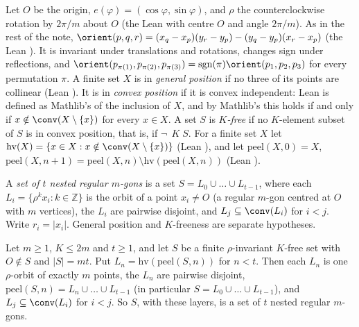 Let $O$ be the origin, $e(\varphi)=(\cos\varphi,\sin\varphi)$, and $\rho$ the counterclockwise rotation by $2\pi/m$
about $O$ (the Lean  with centre $O$ and angle $2\pi/m$). As in the rest of the note,
$\orient(p,q,r)=(x_q-x_p)(y_r-y_p)-(y_q-y_p)(x_r-x_p)$ (the Lean ). It is invariant under translations
and rotations, changes sign under reflections, and $\orient(p_{\pi(1)},p_{\pi(2)},p_{\pi(3)})=\sgn(\pi)\orient(p_1,p_2,p_3)$
for every permutation $\pi$. A finite set $X$ is in \emph{general position} if no three of its points are collinear
(Lean ). It is in \emph{convex position} if it is convex independent: Lean 
is defined as Mathlib's  of the inclusion of $X$, and by Mathlib's
 this holds if and only if $x\notin\conv(X\setminus\{x\})$ for
every $x\in X$. A set $S$ is \emph{$K$-free} if no $K$-element subset of $S$ is in convex position, that is, if
$\neg\,$$\;K\;S$. For a finite set $X$ let $\mathrm{hv}(X)=\{x\in X: x\notin\conv(X\setminus\{x\})\}$
(Lean ), and let $\mathrm{peel}(X,0)=X$,
$\mathrm{peel}(X,n+1)=\mathrm{peel}(X,n)\setminus\mathrm{hv}(\mathrm{peel}(X,n))$ (Lean ).

\begin{definition}\label{k8s:def:nested}
A \emph{set of $t$ nested regular $m$-gons} is a set $S=L_0\cup\dots\cup L_{t-1}$, where each $L_i=\{\rho^kx_i:k\in\mathbb Z\}$
is the orbit of a point $x_i\ne O$ (a regular $m$-gon centred at $O$ with $m$ vertices), the $L_i$ are pairwise
disjoint, and $L_j\subseteq\conv(L_i)$ for $i<j$. Write $r_i=|x_i|$. General position and $K$-freeness are separate
hypotheses.
\end{definition}

\begin{lemma}\label{k8s:lem:layer}
Let $m\ge1$, $K\le2m$ and $t\ge1$, and let $S$ be a finite $\rho$-invariant $K$-free set with $O\notin S$ and $|S|=mt$.
Put $L_n=\mathrm{hv}(\mathrm{peel}(S,n))$ for $n<t$. Then each $L_n$ is one $\rho$-orbit of exactly $m$ points, the $L_n$
are pairwise disjoint, $\mathrm{peel}(S,n)=L_n\cup\dots\cup L_{t-1}$ (in particular $S=L_0\cup\dots\cup L_{t-1}$), and
$L_j\subseteq\conv(L_i)$ for $i<j$. So $S$, with these layers, is a set of $t$ nested regular $m$-gons.
\end{lemma}

